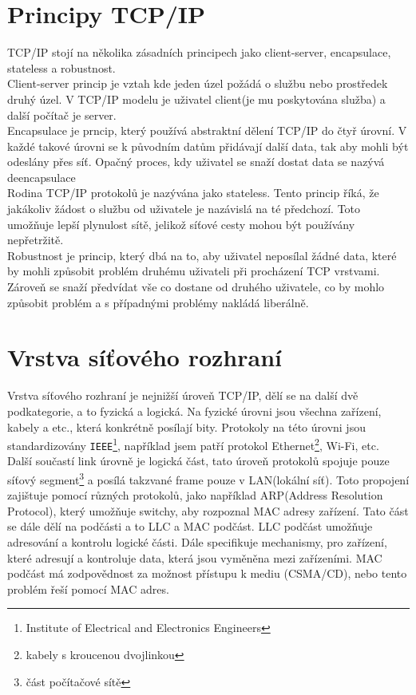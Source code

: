 \documentclass[12pt]{report}			%
\begin{document}
			\section{Principy TCP/IP}
			TCP/IP stojí na několika zásadních principech jako client-server, encapsulace, stateless a robustnost. 
\\
Client-server princip je vztah kde jeden úzel požádá o službu nebo
 prostředek druhý úzel. V TCP/IP modelu je uživatel  client(je mu poskytována služba) a další počítač je server. 
\\
Encapsulace je prncip, který používá abstraktní dělení TCP/IP do čtyř úrovní. V každé takové úrovni se k původním datům přidávají další data, tak aby mohli být odeslány přes síť. Opačný proces, kdy uživatel se snaží dostat data se nazývá deencapsulace 
\\
Rodina TCP/IP protokolů je nazývána jako stateless. Tento princip říká, že jakákoliv žádost o službu od uživatele je nazávislá na té předchozí. Toto umožňuje lepší plynulost sítě, jelikož síťové cesty mohou být používány nepřetržitě.
\\
Robustnost je princip, který dbá na to, aby uživatel neposílal žádné data, které by mohli způsobit problém druhému uživateli při procházení TCP vrstvami. Zároveň se snaží předvídat vše co dostane od druhého uživatele, co by mohlo způsobit problém a s případnými problémy nakládá liberálně.\cite{Princip1}  \cite{zakladykomunikace1}  \cite{Princip3}  \cite{Princip4}  \cite{Princip5}  \cite{Princip6}
			
			\section{Vrstva síťového rozhraní}
			Vrstva síťového rozhraní je nejnižší úroveň TCP/IP, dělí se na další dvě podkategorie, a to fyzická a logická. Na fyzické úrovni jsou všechna zařízení, kabely a etc., která konkrétně posílají bity. Protokoly na této úrovni jsou standardizovány \texttt{IEEE}\footnote{Institute of Electrical and Electronics Engineers}, například jsem patří protokol Ethernet\footnote{kabely s kroucenou dvojlinkou}, Wi-Fi, etc.
 \\
Další součastí link úrovně je logická část, tato úroveň protokolů spojuje pouze síťový segment\footnote{část počítačové sítě} a posílá takzvané frame pouze v LAN(lokální síť). Toto propojení zajištuje pomocí různých protokolů, jako například ARP(Address Resolution Protocol), který umožňuje switchy, aby rozpoznal MAC adresy zařízení. Tato část se dále dělí na podčásti a to LLC a MAC podčást. LLC podčást umožňuje adresování a kontrolu logické části. Dále specifikuje mechanismy, pro zařízení, které adresují a kontroluje data, která jsou vyměněna mezi zařízeními. MAC podčást má zodpovědnost za možnost přístupu k mediu (CSMA/CD), nebo tento problém řeší pomocí MAC adres. \cite{Princip5} \cite{Link2} \cite{Link3} \cite{Link4} \cite{Link5} \cite{Link6}
\end{document}
